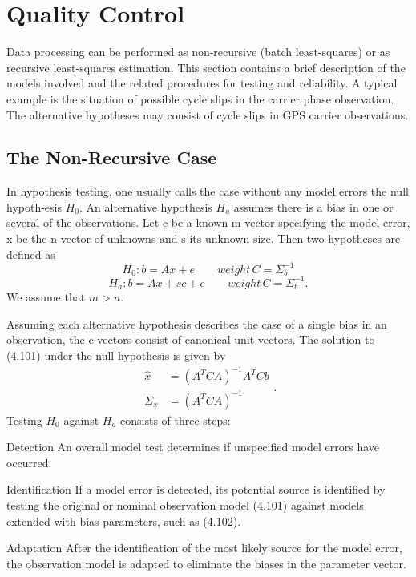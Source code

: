 \section{Quality Control}
Data processing can be performed as non-recursive (batch least-squares) or as recursive
least-squares estimation. This section contains a brief description of the models involved
and the related procedures for testing and reliability. A typical example is the situation
of possible cycle slips in the carrier phase observation. The alternative hypotheses may
consist of cycle slips in GPS carrier observations.
	\subsection{The Non-Recursive Case}
	In hypothesis testing, one usually calls the case without any model errors the null hypoth-esis $H_0$. An alternative hypothesis $H_a$ assumes there is a bias in one or several of the
	observations. Let c be a known m-vector specifying the model error, x be the n-vector of
	unknowns and s its unknown size. Then two hypotheses are defined as
	\begin{equation}
	H_0: b=Ax+e  \qquad weight\,C=\Sigma^{-1}_b
	\end{equation}
	\begin{equation}
	H_a:b=Ax+sc+e  \qquad weight\,C=\Sigma^{-1}_b.
	\end{equation}
	We assume that $m > n$.
	
	Assuming each alternative hypothesis describes the case of a single bias in an observation, the c-vectors consist of canonical unit vectors. The solution to (4.101) under the null hypothesis is given by
	\begin{equation*}
	\begin{split}
	\hat{x}&=(A^TCA)^{-1}A^TCb\\
	\Sigma_{\hat{x}}&=(A^TCA)^{-1}
	\end{split}.
	\end{equation*}
	Testing $H_0$ against $H_a$ consists of three steps:
	
	Detection\; An overall model test determines if unspecified model errors have occurred.
	
	Identification\; If a model error is detected, its potential source is identified by testing the
	original or nominal observation model (4.101) against models extended with bias	parameters, such as (4.102). 
	
	Adaptation \; After the identification of the most likely source for the model error, the observation model is adapted to eliminate the biases in the parameter vector.
	
